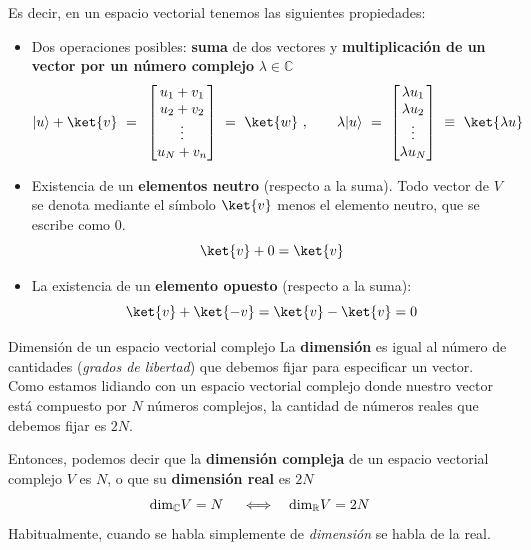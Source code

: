 \documentclass[a4paper,11pt]{book} %
\numberwithin{equation}{chapter}
\begin{document}
Es decir,  en un espacio vectorial  tenemos las siguientes propiedades:
	\begin{itemize}
	\item Dos operaciones posibles: \textbf{suma }de dos vectores y \textbf{multiplicación de un vector por un número complejo }$\lambda\in {\mathbb C}$
	\begin{equation}
 |u\rangle + \ket{v}~ =~\, 
\begin{bmatrix} {u_1}+v_1\\ {u_2}+v_2\\ \vdots \\ {u_N}+v_n \end{bmatrix} ~= ~\ket{w}\ , \qquad \lambda|u\rangle ~ =~   \begin{bmatrix} {\lambda u_1}\\ {\lambda u_2}\\ \vdots \\ {\lambda u_N} \end{bmatrix} ~\equiv~\ket{\lambda u}
	\end{equation}
	
	\item Existencia de un \textbf{elementos neutro} (respecto a la suma). Todo vector de $V$ se denota mediante el símbolo $\ket{v}$ menos el elemento neutro, que se escribe como $0$.
		\begin{equation}
			\ket{v} + 0 = \ket{v}
		\end{equation}
	
	\item La existencia de un \textbf{elemento opuesto} (respecto a la suma):
		\begin{equation}
		\ket{v} + \ket{-v} = \ket{v}-\ket{v} = 0
		\end{equation}
	\end{itemize}

	\begin{mybox_blue}{Dimensión de un espacio vectorial complejo}
	La \textbf{dimensión} es igual al número de cantidades (\textit{grados de libertad}) que debemos fijar para especificar un vector. Como estamos lidiando con un espacio vectorial complejo donde nuestro vector está compuesto por $N$ números complejos, la cantidad de números reales que debemos fijar es $2N$.
   \vspace{0.3cm}
   
Entonces, podemos decir que la \textbf{dimensión compleja} de un espacio vectorial complejo $V$ es $N$, o que su \textbf{dimensión real} es $2N$ 
	\begin{equation}
	{\rm dim}_{\mathbb C} V = N ~~~~\Longleftrightarrow ~~~   {\rm dim}_{\mathbb R} V = 2N
	\end{equation}
Habitualmente, cuando se habla simplemente de \textit{dimensión} se habla de la real.
	\end{mybox_blue}	
	
\end{document}
